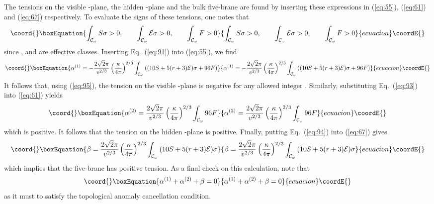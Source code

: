 \documentclass[a4paper,12pt]{article}
\numberwithin{equation}{section}
\theoremstyle{plain}
\begin{document}
The tensions on the visible \coordHE{}-plane, the hidden
\coordHE{}-plane and the bulk five-brane are found by inserting these expressions in 
(\ref{eq:55}), (\ref{eq:61}) and (\ref{eq:67}) respectively. To evaluate the
signs of these tensions, one notes that
%
\begin{equation}\coord{}\boxEquation{
\int_{{\cal{C}}_{\omega}}{S\sigma}>0, \qquad \int_{{\cal{C}}_{\omega}}
{{\cal{E}}\sigma}>0, \qquad \int_{{\cal{C}}_{\omega}}{F}>0
\label{eq:95}
}{
\int_{{\cal{C}}_{\omega}}{S\sigma}>0, \qquad \int_{{\cal{C}}_{\omega}}
{{\cal{E}}\sigma}>0, \qquad \int_{{\cal{C}}_{\omega}}{F}>0
}{ecuacion}\coordE{}\end{equation}
%
since \coordHE{}, \coordHE{} and \coordHE{} are effective classes. Inserting
Eq.~(\ref{eq:91}) into (\ref{eq:55}),  we find 
%
\begin{equation}\coord{}\boxEquation{
\alpha^{(1)}=-\frac{2\sqrt{2}\pi}{v^{2/3}}\left(\frac{\kappa}{4\pi}\right)^{2/3}
\int_{{\cal{C}}_{\omega}}{((10S+5(r+3){\cal{E}})\sigma+96F)}
\label{eq:96}
}{
\alpha^{(1)}=-\frac{2\sqrt{2}\pi}{v^{2/3}}\left(\frac{\kappa}{4\pi}\right)^{2/3}
\int_{{\cal{C}}_{\omega}}{((10S+5(r+3){\cal{E}})\sigma+96F)}
}{ecuacion}\coordE{}\end{equation}
%
It follows that, using (\ref{eq:95}), the tension on the visible 
\coordHE{}-plane is negative for any allowed integer \coordHE{}. Similarly, 
substituting Eq.~(\ref{eq:93}) into (\ref{eq:61}) yields
%
\begin{equation}\coord{}\boxEquation{
\alpha^{(2)}=\frac{2\sqrt{2}\pi}{v^{2/3}}\left(\frac{\kappa}{4\pi}\right)^{2/3}
\int_{{\cal{C}}_{\omega}}{96F}
\label{eq:97}
}{
\alpha^{(2)}=\frac{2\sqrt{2}\pi}{v^{2/3}}\left(\frac{\kappa}{4\pi}\right)^{2/3}
\int_{{\cal{C}}_{\omega}}{96F}
}{ecuacion}\coordE{}\end{equation}
%
which is positive. It follows that 
the tension on the hidden \coordHE{}-plane is positive. Finally,
putting Eq.~(\ref{eq:94}) into (\ref{eq:67}) gives
%
\begin{equation}\coord{}\boxEquation{
\beta=\frac{2\sqrt{2}\pi}{v^{2/3}}\left(\frac{\kappa}{4\pi}\right)^{2/3}
\int_{{\cal{C}}_{\omega}}{(10S+5(r+3){\cal{E}})\sigma}
\label{eq:98}
}{
\beta=\frac{2\sqrt{2}\pi}{v^{2/3}}\left(\frac{\kappa}{4\pi}\right)^{2/3}
\int_{{\cal{C}}_{\omega}}{(10S+5(r+3){\cal{E}})\sigma}
}{ecuacion}\coordE{}\end{equation}
%
which implies that the five-brane has positive tension. As a final check on 
this calculation, note that 
%
\begin{equation}\coord{}\boxEquation{
\alpha^{(1)}+\alpha^{(2)}+ \beta=0
\label{eq:99}
}{
\alpha^{(1)}+\alpha^{(2)}+ \beta=0
}{ecuacion}\coordE{}\end{equation}
%
as it must to satisfy the topological anomaly cancellation condition.
\end{document}

